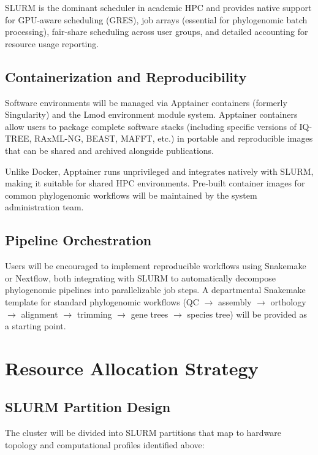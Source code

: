 SLURM is the dominant scheduler in academic HPC and provides native support for GPU-aware scheduling (GRES), job arrays (essential for phylogenomic batch processing), fair-share scheduling across user groups, and detailed accounting for resource usage reporting.

\subsection{Containerization and Reproducibility}

Software environments will be managed via Apptainer containers (formerly Singularity) and the Lmod environment module system. Apptainer containers allow users to package complete software stacks (including specific versions of IQ-TREE, RAxML-NG, BEAST, MAFFT, etc.) in portable and reproducible images that can be shared and archived alongside publications.

Unlike Docker, Apptainer runs unprivileged and integrates natively with SLURM, making it suitable for shared HPC environments. Pre-built container images for common phylogenomic workflows will be maintained by the system administration team.

\subsection{Pipeline Orchestration}

Users will be encouraged to implement reproducible workflows using Snakemake \parencite{molder2021} or Nextflow, both integrating with SLURM to automatically decompose phylogenomic pipelines into parallelizable job steps. A departmental Snakemake template for standard phylogenomic workflows (QC $\rightarrow$ assembly $\rightarrow$ orthology $\rightarrow$ alignment $\rightarrow$ trimming $\rightarrow$ gene trees $\rightarrow$ species tree) will be provided as a starting point.

\section{Resource Allocation Strategy}

\subsection{SLURM Partition Design}

The cluster will be divided into SLURM partitions that map to hardware topology and computational profiles identified above:

